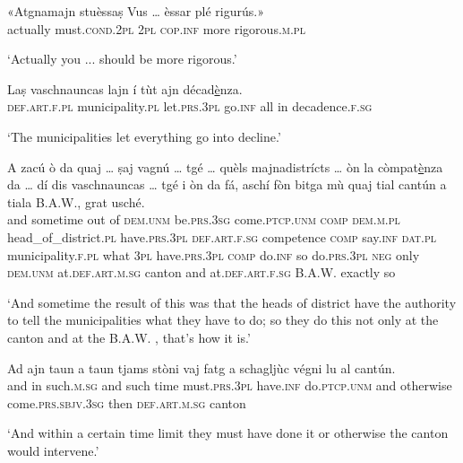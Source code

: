 \begin{linenumbers}
\gll «Atgnamajn stuèssaṣ Vus … èssar plé rigurús.»   \\
actually must.\textsc{cond.2pl} \textsc{2pl} {} \textsc{cop.inf} more rigorous.\textsc{m.pl}\\
\end{linenumbers}
\medskip
\glt `Actually you ... should be more rigorous.'
\medskip

\begin{linenumbers}
\gll Laṣ vaschnauncas lajn í tùt ajn décad\underline{è}nza.   \\
 \textsc{def.art.f.pl} municipality.\textsc{pl} let.\textsc{prs.3pl} go.\textsc{inf} all in decadence.\textsc{f.sg}  \\
\end{linenumbers}
\medskip
\glt `The municipalities let everything go into decline.'
\medskip

\begin{linenumbers}
\gll A zacú ò da quaj … ṣaj vagnú … tgé … quèls majnadistrícts … òn la còmpat\underline{è}nza da … dí dis vaschnauncas … tgé i òn da fá, aschí fòn bitga mù quaj tial cantún a tiala B.A.W.\footnotemark, grat usché.\\
and sometime out of \textsc{dem.unm} {} be.\textsc{prs.3sg} come.\textsc{ptcp.unm} {} \textsc{comp} {} \textsc{dem.m.pl} head\_of\_district.\textsc{pl} {} have.\textsc{prs.3pl} \textsc{def.art.f.sg} competence \textsc{comp} {} say.\textsc{inf}  \textsc{dat.pl} municipality.\textsc{f.pl} {} what \textsc{3pl} have.\textsc{prs.3pl} \textsc{comp} do.\textsc{inf} so do.\textsc{prs.3pl} \textsc{neg} only  \textsc{dem.unm} at.\textsc{def.art.m.sg} canton and at.\textsc{def.art.f.sg} B.A.W. exactly so \\
\end{linenumbers}
\medskip
\glt `And sometime the result of this was that the heads of district have the authority to tell the municipalities what they have to do; so they do this not only at the canton and at the B.A.W. , that's how it is.'
\medskip

\begin{linenumbers}
\gll Ad ajn taun a taun tjams stòni vaj fatg a schagljùc végni lu al cantún.\\
and in such.\textsc{m.sg} and such time must.\textsc{prs.3pl} have.\textsc{inf} do.\textsc{ptcp.unm} and otherwise come.\textsc{prs.sbjv.3sg} then \textsc{def.art.m.sg} canton\\
\end{linenumbers}
\medskip
\glt `And within a certain time limit they must have done it or otherwise the canton would intervene.'
\medskip


